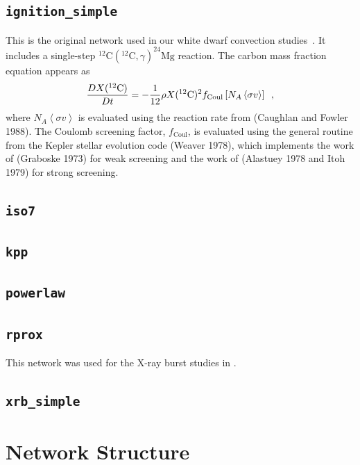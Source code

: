 \subsection{{\tt ignition\_simple}}

This is the original network used in our white dwarf convection
studies~\cite{lowMach4}.  It includes a single-step
$^{12}\mathrm{C}(^{12}\mathrm{C},\gamma)^{24}\mathrm{Mg}$ reaction.
The carbon mass fraction equation appears as
\begin{equation}
\frac{D X(^{12}\mathrm{C})}{Dt} = - \frac{1}{12} \rho X(^{12}\mathrm{C})^2
    f_\mathrm{Coul} \left [N_A \left <\sigma v \right > \right]\enskip,
\end{equation}
where $N_A \left <\sigma v\right>$ is evaluated using the reaction
rate from (Caughlan and Fowler 1988).  The Coulomb screening factor,
$f_\mathrm{Coul}$, is evaluated using the general routine from the
Kepler stellar evolution code (Weaver 1978), which implements the work
of (Graboske 1973) for weak screening and the work of (Alastuey 1978
and Itoh 1979) for strong screening.


\subsection{{\tt iso7}}


\subsection{{\tt kpp}}


\subsection{{\tt powerlaw}}


\subsection{{\tt rprox}}

This network was used for the X-ray burst studies in \cite{xrb:II,xrb:III}.


\subsection{{\tt xrb\_simple}}



\section{Network Structure}
\label{section:network_structure}

